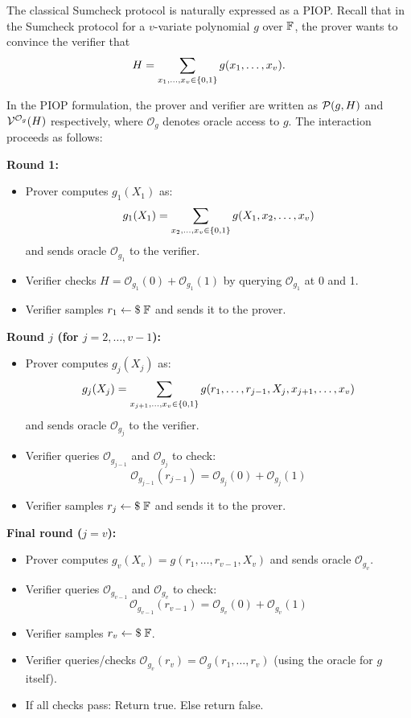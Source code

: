 \documentclass[11pt]{article}
\begin{document}
The classical Sumcheck protocol is naturally expressed as a PIOP. Recall that
in the Sumcheck protocol for a $v$-variate polynomial $g$ over $\mathbb{F}$, the prover
wants to convince the verifier that
\[
  H = \sum_{x_1,\ldots,x_v \in \{0,1\}} g(x_1, \ldots, x_v).
\]

In the PIOP formulation, the prover and verifier are written as
$\mathcal{P}(g, H)$ and $\mathcal{V}^{\mathcal{O}_g}(H)$ respectively, where
$\mathcal{O}_g$ denotes oracle access to $g$. The interaction proceeds as
follows:

\bigskip
\noindent\textbf{Round 1:}
\begin{itemize}
  \item Prover computes $g_1(X_1)$ as:
    \[
      g_1(X_1) = \sum_{x_2, \ldots, x_v \in \{0,1\}} g(X_1, x_2, \ldots, x_v)
    \]
    and sends oracle $\mathcal{O}_{g_1}$ to the verifier.
  \item Verifier checks $H = \mathcal{O}_{g_1}(0) + \mathcal{O}_{g_1}(1)$ by
    querying $\mathcal{O}_{g_1}$ at 0 and 1.
  \item Verifier samples $r_1 \leftarrow \$ \; \mathbb{F}$ and sends it to the prover.
\end{itemize}

\bigskip
\noindent\textbf{Round $j$ (for $j = 2, \ldots, v-1$):}
\begin{itemize}
  \item Prover computes $g_j(X_j)$ as:
    \[
      g_j(X_j) = \sum_{x_{j+1}, \ldots, x_v \in \{0,1\}}
        g(r_1, \ldots, r_{j-1}, X_j, x_{j+1}, \ldots, x_v)
    \]
    and sends oracle $\mathcal{O}_{g_j}$ to the verifier.
  \item Verifier queries $\mathcal{O}_{g_{j-1}}$ and $\mathcal{O}_{g_j}$ to
    check:
    \[
      \mathcal{O}_{g_{j-1}}(r_{j-1}) = \mathcal{O}_{g_j}(0) + \mathcal{O}_{g_j}(1)
    \]
  \item Verifier samples $r_j \leftarrow \$ \; \mathbb{F}$ and sends it to the prover.
\end{itemize}

\bigskip
\noindent\textbf{Final round ($j = v$):}
\begin{itemize}
  \item Prover computes $g_v(X_v) = g(r_1, \ldots, r_{v-1}, X_v)$ and sends
    oracle $\mathcal{O}_{g_v}$.
  \item Verifier queries $\mathcal{O}_{g_{v-1}}$ and $\mathcal{O}_{g_v}$ to
    check:
    \[
      \mathcal{O}_{g_{v-1}}(r_{v-1}) = \mathcal{O}_{g_v}(0) + \mathcal{O}_{g_v}(1)
    \]
  \item Verifier samples $r_v \leftarrow \$ \; \mathbb{F}$.
  \item Verifier queries/checks $\mathcal{O}_{g_v}(r_v) = \mathcal{O}_g(r_1,
    \ldots, r_v)$ (using the oracle for $g$ itself).
  \item If all checks pass: Return true. Else return false.
\end{itemize}
\end{document}
